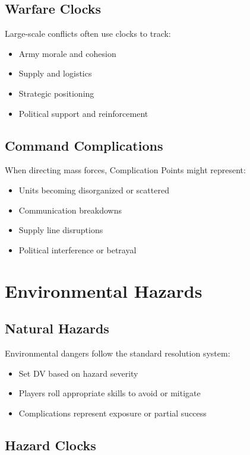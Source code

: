 \subsection{Warfare Clocks}

Large-scale conflicts often use clocks to track:
\begin{itemize}
\item Army morale and cohesion
\item Supply and logistics
\item Strategic positioning
\item Political support and reinforcement
\end{itemize}

\subsection{Command Complications}

When directing mass forces, Complication Points might represent:
\begin{itemize}
\item Units becoming disorganized or scattered
\item Communication breakdowns
\item Supply line disruptions
\item Political interference or betrayal
\end{itemize}

\section{Environmental Hazards}

\subsection{Natural Hazards}

Environmental dangers follow the standard resolution system:
\begin{itemize}
\item Set DV based on hazard severity
\item Players roll appropriate skills to avoid or mitigate
\item Complications represent exposure or partial success
\end{itemize}

\subsection{Hazard Clocks}

